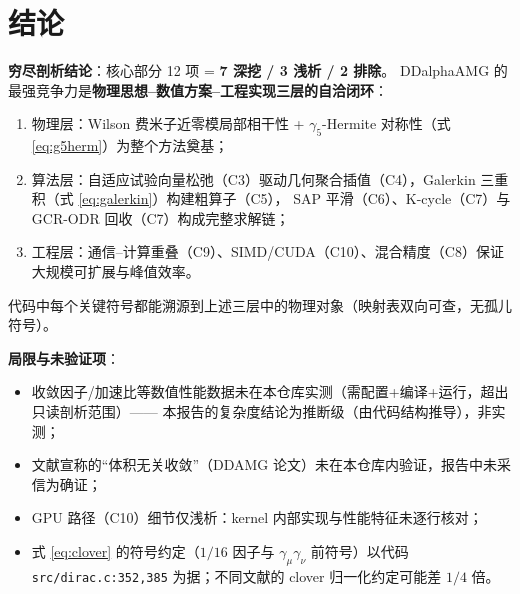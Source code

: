 \documentclass[UTF8]{ctexart}
\begin{document}
\section{结论}
\begin{conclbox}
\textbf{穷尽剖析结论}：核心部分 12 项 = \textbf{7 深挖 / 3 浅析 / 2 排除}。
DDalphaAMG 的最强竞争力是\textbf{物理思想--数值方案--工程实现三层的自洽闭环}：
\begin{enumerate}
\item 物理层：Wilson 费米子近零模局部相干性 + $\gamma_5$-Hermite 对称性（式 \eqref{eq:g5herm}）为整个方法奠基；
\item 算法层：自适应试验向量松弛（C3）驱动几何聚合插值（C4），Galerkin 三重积（式 \eqref{eq:galerkin}）构建粗算子（C5），
      SAP 平滑（C6）、K-cycle（C7）与 GCR-ODR 回收（C7）构成完整求解链；
\item 工程层：通信--计算重叠（C9）、SIMD/CUDA（C10）、混合精度（C8）保证大规模可扩展与峰值效率。
\end{enumerate}
代码中每个关键符号都能溯源到上述三层中的物理对象（映射表双向可查，无孤儿符号）。
\end{conclbox}
\begin{warnbox}
\textbf{局限与未验证项}：
\begin{itemize}
\item 收敛因子/加速比等数值性能数据未在本仓库实测（需配置+编译+运行，超出只读剖析范围）——
  本报告的复杂度结论为\textcolor{phys}{推断}级（由代码结构推导），非实测；
\item 文献宣称的``体积无关收敛''（DD\textalpha AMG 论文）未在本仓库内验证，报告中未采信为确证；
\item GPU 路径（C10）细节仅浅析：kernel 内部实现与性能特征未逐行核对；
\item 式 \eqref{eq:clover} 的符号约定（$1/16$ 因子与 $\gamma_\mu\gamma_\nu$ 前符号）以代码
  \texttt{\nolinkurl{src/dirac.c:352,385}} 为据；不同文献的 clover 归一化约定可能差 $1/4$ 倍。
\end{itemize}
\end{warnbox}
\end{document}
